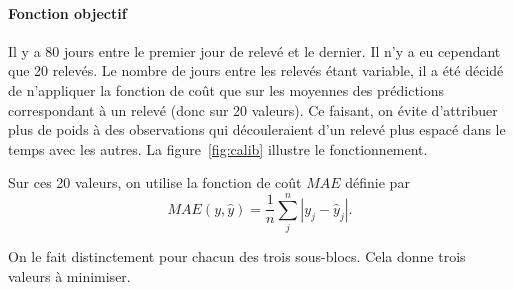 \documentclass[a4paper, 11pt]{article}
\begin{document}
\paragraph{Fonction objectif}Il y a 80 jours entre le premier jour de relevé et le dernier. Il n'y a eu cependant que 20 relevés. Le nombre de jours entre les relevés étant variable, il a été décidé de n'appliquer la fonction de coût que sur les moyennes des prédictions correspondant à un relevé (donc sur 20 valeurs). Ce faisant, on évite d'attribuer plus de poids à des observations qui découleraient d'un relevé plus espacé dans le temps avec les autres. La figure~\ref{fig:calib} illustre le fonctionnement.

Sur ces 20 valeurs, on utilise la fonction de coût $MAE$ définie par
$$
MAE(y, \hat y) = \frac{1}{n}\sum_j^n | y_j - \hat y_j |.
$$

On le fait distinctement pour chacun des trois sous-blocs. Cela donne trois valeurs à minimiser.
\end{document}
